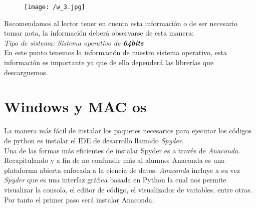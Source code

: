\documentclass[a4paper, openright, 12pt]{article}
\begin{document}
    \begin{figure}[ht]
    \centering
    \texttt{[image: /w\_3.jpg]}
    \end{figure}

    Recomendamos al lector tener en cuenta esta información o de ser necesario tomar nota, la información deberá observarse de esta manera:\\

    \textit{  Tipo de sistema: Sistema operativo de \textbf{64bits}}\\

    En este punto tenemos la información de nuestro sistema operativo, esta información es importante ya que de ello dependerá las librerías que descarguemos.

    \newpage{}





  \section{Windows  y MAC os}
    La manera más fácil de instalar los paquetes necesarios para ejecutar los códigos de python es instalar el IDE de desarrollo llamado \textit{Spyder}.\\

    Una de las formas más eficientes de instalar Spyder es a través de \textit{Anaconda}. Recapitulando y a fin de no confundir más al alumno: Anaconda es una plataforma abierta enfocada a la ciencia de datos. \textit{Anaconda} incluye a su vez \textit{Spyder} que es una interfaz gráfica basada en Python la cual nos permite visualizar la consola, el editor de código, el visualizador de variables, entre otras.\\

    Por tanto el primer paso será instalar Anaconda.\\
\end{document}
